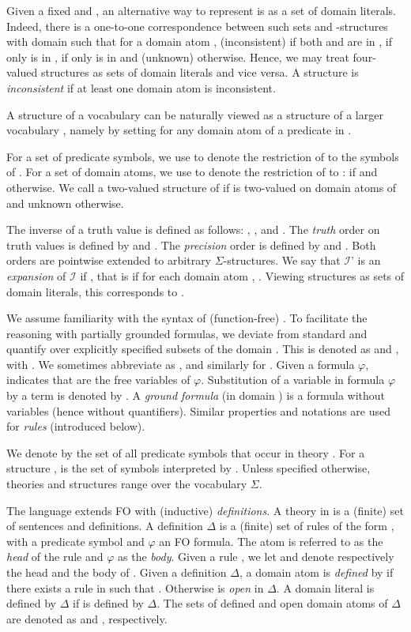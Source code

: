 \documentclass[11pt]{article}
\newcommand{\m}[1]{\ensuremath{#1}\xspace}
\newcommand{\voc}{\m{\Sigma}}
\newcommand{\I}{\m{\mathcal{I}}}
\newcommand{\D}{\m{\Delta}}
\newcommand{\f}{\m{\varphi}}
\newcommand{\logicname}[1]{\text{\sc #1}\xspace}
\newcommand{\foid}{\logicname{FO(\ensuremath{ID})}}
\theoremstyle{plain}
\theoremstyle{definition}
\theoremstyle{example_basic}
\theoremstyle{example_contd}
\theoremstyle{plain}
\newcommand{\change}[1]{#1}
\begin{document}
\change{Given a fixed  and , an alternative way to represent  is as a set  of domain literals.} Indeed, there is a one-to-one correspondence between such sets  and -structures  with domain  such that for a domain atom ,  (inconsistent) if both  and  are in ,  if only  is in ,  if only  is in  and  (unknown) otherwise. \change{Hence, we may treat four-valued structures as sets of domain literals and vice versa. A structure is {\em inconsistent} if at least one domain atom is inconsistent.}

\change{A structure  of a vocabulary  can be naturally viewed as a structure of a larger vocabulary , namely by setting  for any domain atom of a predicate in .}

\change{For a set    of predicate symbols,  we use  to
denote the restriction of  to the symbols of .}  For a set  of
domain atoms, we use  to denote the restriction of
 to :  if  and
 otherwise.  We call  a two-valued
structure of  if  is two-valued on domain atoms of  and
unknown otherwise.

\change{The inverse  of a truth value  is defined as follows:
, ,  and .}  The \emph{truth} order  on
truth values is defined by  and
.  The \emph{precision} order  is
defined by  and . Both orders are pointwise extended to arbitrary
\voc-structures. We say that \I' is an \emph{expansion} of \I if
, that is if for each domain atom , .  Viewing structures as sets of domain literals, this
corresponds to .

We assume familiarity with the syntax of (function-free) \FO. 
\change{To facilitate the reasoning with partially grounded formulas,
  we deviate from standard \FO and quantify  over explicitly
specified subsets of the domain . This is denoted as  and , with .}
We sometimes abbreviate  as , and similarly for . Given a formula \f,  indicates that  are the free variables of \f. Substitution of a variable  in formula \f by a term  is denoted by .  A \emph{ground formula} (in domain ) is a formula without variables (hence without quantifiers). Similar properties and notations are used for \emph{rules} (introduced below).

We denote by  the set of all predicate symbols that occur in theory . For a structure ,  is the set of symbols interpreted by . Unless specified otherwise, theories and structures range over the vocabulary \voc. 

The language \foid extends FO with (inductive) \emph{definitions}. A
theory in \foid is  a (finite) set of sentences and definitions. A
definition \D is a (finite) set of rules of the form , with  a predicate symbol and \f an FO
formula. The atom  is referred to as the \emph{head} of the
rule and \f as the \emph{body}.  Given a rule , we let 
and  denote respectively the head and the body of .
Given a definition \D, a domain atom  is {\em defined}
by  if there exists a rule  in  such that . Otherwise  is
\emph{open} in \D. A domain literal  is defined by
\D if  is defined by \D. The sets of defined and open
domain atoms of \D are denoted as  and ,
respectively.
\end{document}

